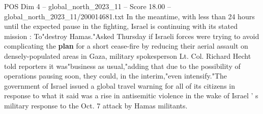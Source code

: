 \begin{textsample}{POS Dim 4 – global\_north\_2023\_11 – Score 18.00 – global\_north\_2023\_11/200014681.txt}
In the meantime, with less than 24 hours until the expected pause in the fighting, Israel is continuing with its stated mission : To"destroy Hamas."Asked Thursday if Israeli forces were trying to avoid complicating the \textbf{plan} for a short cease-fire by reducing their aerial assault on densely-populated areas in Gaza, military spokesperson Lt.
Col.
Richard Hecht told reporters it was"business as usual,"adding that due to the possibility of operations pausing soon, they could, in the interim,"even intensify."The government of Israel issued a global travel warning for all of its citizens in response to what it said was a rise in antisemitic violence in the wake of Israel ' s military response to the Oct. 7 attack by Hamas militants.

\end{textsample}
